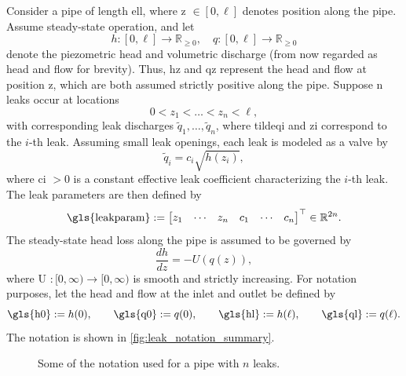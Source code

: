 Consider a pipe of length \gls{ell}, where \gls{z} $\in [0, \ell]$ denotes position along the pipe. Assume steady-state operation, and let
\[
h : [0,\ell] \to \mathbb{R}_{\geq0}, \quad q : [0,\ell] \to \mathbb{R}_{\geq0}
\]
denote the piezometric head and volumetric discharge (from now regarded as head and flow for brevity). Thus, \gls{hz} and \gls{qz} represent the head and flow at position \gls{z}, which are both assumed strictly positive along the pipe. Suppose \gls{n} leaks occur at locations
\[
0 < z_1 < \dots < z_n < \ell,
\]
with corresponding leak discharges $\tilde q_1,\dots,\tilde q_n$, where \gls{tildeqi} and \gls{zi} correspond to the $i$-th leak. Assuming small leak openings, each leak is modeled as a valve by
\[
\tilde{q}_i = c_i \sqrt{h(z_i)},
\]
where \gls{ci} $>0$ is a constant effective leak coefficient characterizing the $i$-th leak. The leak parameters are then defined by
\begin{equation*}
    \text{\gls{leakparam}} := \begin{bmatrix}
    z_1 & \cdots & z_n & c_1 & \cdots & c_n
\end{bmatrix}^\top \in \mathbb{R}^{2n}.
\end{equation*}
The steady-state head loss along the pipe is assumed to be governed by
\begin{equation}
\label{eq:task_desc_ufunc}
\frac{dh}{dz} = -U(q(z)),
\end{equation}
where \gls{U} $:[0,\infty)\to[0,\infty)$ is smooth and strictly increasing. For notation purposes, let the head and flow at the inlet and outlet be defined by
\[
\text{\gls{h0}} := h(0), \qquad \text{\gls{q0}} := q(0), \qquad
\text{\gls{hl}} := h(\ell), \qquad \text{\gls{ql}} := q(\ell).
\]
The notation is shown in \autoref{fig:leak_notation_summary}.

\begin{figure}[h]
    \centering
    
    \vspace{-6mm}
    \caption[Some of the notation used for a pipe with $n$ leaks]{Some of the notation used for a pipe with $n$ leaks.}
    \label{fig:leak_notation_summary}
\end{figure}

\FloatBarrier
\newpage

